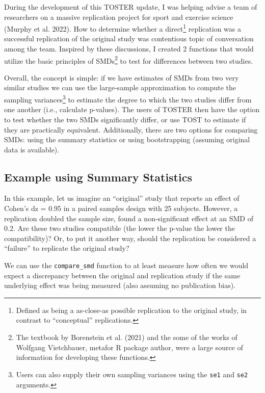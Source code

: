 \documentclass[
]{interact}
\begin{document}
During the development of this TOSTER update, I was helping advise a
team of researchers on a massive replication project for sport and
exercise science (Murphy et al. 2022). How to determine whether a
direct\footnote{Defined as being a as-close-as possible replication to
  the original study, in contrast to ``conceptual'' replications.}
replication was a successful replication of the original study was
contentious topic of conversation among the team. Inspired by these
discussions, I created 2 functions that would utilize the basic
principles of SMDs\footnote{The textbook by Borenstein et al. (2021) and
  the some of the works of Wolfgang Vietchbauer, metafor R package
  author, were a large source of information for developing these
  functions.} to test for differences between two studies.

Overall, the concept is simple: if we have estimates of SMDs from two
very similar studies we can use the large-sample approximation to
compute the sampling variances\footnote{Users can also supply their own
  sampling variances using the \texttt{se1} and \texttt{se2} arguments.}
to estimate the degree to which the two studies differ from one another
(i.e., calculate p-values). The users of TOSTER then have the option to
test whether the two SMDs significantly differ, or use TOST to estimate
if they are practically equivalent. Additionally, there are two options
for comparing SMDs: using the summary statistics or using bootstrapping
(assuming original data is available).

\hypertarget{example-using-summary-statistics}{%
\subsection{Example using Summary
Statistics}\label{example-using-summary-statistics}}

In this example, let us imagine an ``original'' study that reports an
effect of Cohen's dz = 0.95 in a paired samples design with 25 subjects.
However, a replication doubled the sample size, found a non-significant
effect at an SMD of 0.2. Are these two studies compatible (the lower the
p-value the lower the compatibility)? Or, to put it another way, should
the replication be considered a ``failure'' to replicate the original
study?

We can use the \texttt{compare\_smd} function to at least measure how
often we would expect a discrepancy between the original and replication
study if the same underlying effect was being measured (also assuming no
publication bias).
\end{document}
